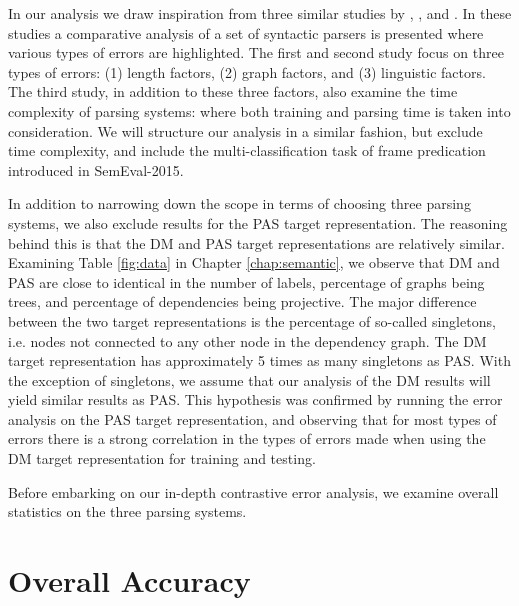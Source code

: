 
In our analysis we draw inspiration from three similar studies by , , and . In these studies a comparative analysis of a set of syntactic parsers is presented where various types of errors are highlighted. The first and second study focus on three types of errors: (1) length factors, (2) graph factors, and (3) linguistic factors. The third study, in addition to these three factors, also examine the time complexity of parsing systems: where both training and parsing time is taken into consideration. We will structure our analysis in a similar fashion, but exclude time complexity, and include the multi-classification task of frame predication introduced in SemEval-2015.

In addition to narrowing down the scope in terms of choosing three parsing systems, we also exclude results for the PAS target representation. The reasoning behind this is that the DM and PAS target representations are relatively similar. Examining Table \ref{fig:data} in Chapter \ref{chap:semantic}, we observe that DM and PAS are close to identical in the number of labels, percentage of graphs being trees, and percentage of dependencies being projective. The major difference between the two target representations is the percentage of so-called singletons, i.e. nodes not connected to any other node in the dependency graph. The DM target representation has approximately 5 times as many singletons as PAS. With the exception of singletons, we assume that our analysis of the DM results will yield similar results as PAS. This hypothesis was confirmed by running the error analysis on the PAS target representation, and observing that for most types of errors there is a strong correlation in the types of errors made when using the DM target representation for training and testing.

Before embarking on our in-depth contrastive error analysis, we examine overall statistics on the three parsing systems.

\section{Overall Accuracy}


